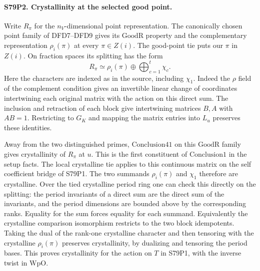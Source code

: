 \paragraph{S79P2. Crystallinity at the selected good point.}
Write $R_\pi$ for the $n_V$-dimensional point representation.
The canonically chosen point family of DFD7--DFD9 gives its
$\mathrm{GoodR}$ property and the complementary representation
$\rho_i(\pi)$ at every $\pi\in Z(i)$. The good-point tie puts our
$\pi$ in $Z(i)$. On fraction spaces its splitting has the form
\[
 R_\pi \simeq \rho_i(\pi)\oplus
                       \bigoplus_{c=1}^{t}\chi_c .
\]
Here the characters are indexed as in the source, including $\chi_1$.
Indeed the $\rho$ field of the complement condition gives an
invertible linear change of coordinates intertwining each original
matrix with the action on this direct sum.
The inclusion and retraction of each block give intertwining
matrices $B,A$ with $AB=1$. Restricting to $G_K$ and mapping the
matrix entries into $L_u$ preserves these identities.

Away from the two distinguished primes, $\mathrm{Conclusion41}$
on this $\mathrm{GoodR}$ family gives crystallinity of $R_\pi$
at $u$. This is the first constituent of $\mathrm{Conclusion1}$
in the setup facts. The local crystalline tie applies to this
continuous matrix on the self coefficient bridge of S79P1.
The two summands $\rho_i(\pi)$ and $\chi_1$ therefore are
crystalline. Over the tied crystalline period ring one can check
this directly on the splitting: the period invariants of a direct
sum are the direct sum of the invariants, and the period dimensions
are bounded above by the corresponding ranks. Equality for the
sum forces equality for each summand. Equivalently the crystalline
comparison isomorphism restricts to the two block idempotents.
Taking the dual of the rank-one crystalline character and then
tensoring with the crystalline $\rho_i(\pi)$ preserves
crystallinity, by dualizing and tensoring the period bases.
This proves crystallinity for the action on $T$ in S79P1, with
the inverse twist in $\mathrm{WpO}$.

